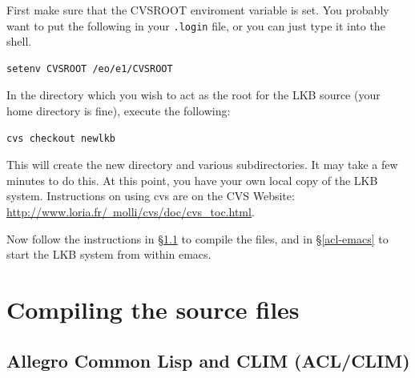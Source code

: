 \documentclass[12pt]{report}
\newcommand{\filename}[1]{{\tt #1}}
\begin{document}
First make sure that the CVSROOT enviroment variable is set.  You probably want
to put the following in your \filename{.login} file, or you can just type it
into the shell.
\begin{verbatim}
setenv CVSROOT /eo/e1/CVSROOT
\end{verbatim}
In the directory which you wish to act as the root for the LKB source
(your home directory is fine), execute the following:
\begin{verbatim}
cvs checkout newlkb
\end{verbatim}
This will create the new directory and various subdirectories.
It may take a few minutes to do this.  At this point, you have 
your own local copy of the LKB system.  Instructions on using
cvs are on the CVS Website:
\href{http://www.loria.fr/~molli/cvs/doc/cvs_toc.html}{http://www.loria.fr/~molli/cvs/doc/cvs_toc.html}.

Now follow the instructions in \S\ref{acl-src} to compile the
files, and in \S\ref{acl-emacs} to start the LKB system from within
emacs.


\section{Compiling the source files}
\label{src}

\subsection{Allegro Common Lisp and CLIM (ACL/CLIM)}
\label{acl-src}
\end{document}
